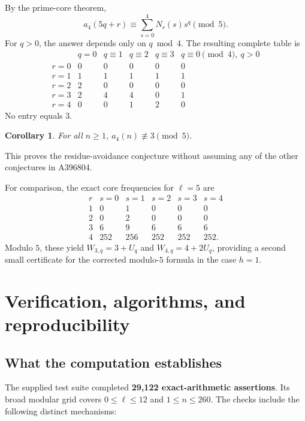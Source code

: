 \documentclass[11pt,letterpaper]{article}
\newtheorem{corollary}[theorem]{Corollary}
\theoremstyle{definition}
\theoremstyle{remark}
\begin{document}
By the prime-core theorem,
\[
 a_4(5q+r)\equiv\sum_{s=0}^4N_r(s)s^q\pmod5.
\]
For $q>0$, the answer depends only on $q\bmod4$. The resulting complete
table is
\begin{equation}\label{eq:avoidtable}
\begin{array}{c|c|rrrr}
 &q=0&q\equiv1&q\equiv2&q\equiv3&q\equiv0\pmod4,\ q>0\\\hline
r=0&0&0&0&0&0\\
r=1&1&1&1&1&1\\
r=2&2&0&0&0&0\\
r=3&2&4&4&0&1\\
r=4&0&0&1&2&0
\end{array}
\end{equation}
No entry equals $3$.
\begin{corollary}\label{cor:avoidance}
For all $n\ge1$, $a_4(n)\not\equiv3\pmod5$.
\end{corollary}
This proves the residue-avoidance conjecture without assuming any of the
other conjectures in A396804.

For comparison, the exact core frequencies for $\ell=5$ are
\begin{equation}\label{eq:weights5}
\begin{array}{c|rrrrr}
 r&s=0&s=1&s=2&s=3&s=4\\\hline
1&0&1&0&0&0\\
2&0&2&0&0&0\\
3&6&9&6&6&6\\
4&252&256&252&252&252.
\end{array}
\end{equation}
Modulo $5$, these yield $W_{3,q}=3+U_q$ and $W_{4,q}=4+2U_q$,
providing a second small certificate for the corrected modulo-$5$
formula in the case $h=1$.

\section{Verification, algorithms, and reproducibility}\label{sec:verification}
\subsection{What the computation establishes}
The supplied test suite completed \textbf{29,122 exact-arithmetic
assertions}. Its broad modular grid covers $0\le\ell\le12$ and
$1\le n\le260$. The checks include the following distinct mechanisms:
\end{document}

